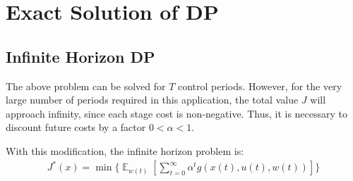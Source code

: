 \documentclass[conference]{IEEEtran}
\DeclareMathOperator{\E}{\mathbb{E}}
\begin{document}





\section{Exact Solution of DP}
\subsection{Infinite Horizon DP}
The above problem can be solved for $T$ control periods. However, for the very large number of periods required in this application, the total value $J$ will approach infinity, since each stage cost is non-negative. Thus, it is necessary to discount future costs by a factor $0<\alpha<1$.

With this modification, the infinite horizon problem is:
\begin{multline} \label{eq:DP}
J^{*}(x)= \min\Biggl\{\mathop{\E}_{w(t)}\left[\sum_{t=0}^{\infty}\alpha^{t}g(x(t),u(t),w(t))\right]\Biggr\}
\end{multline}
\end{document}
